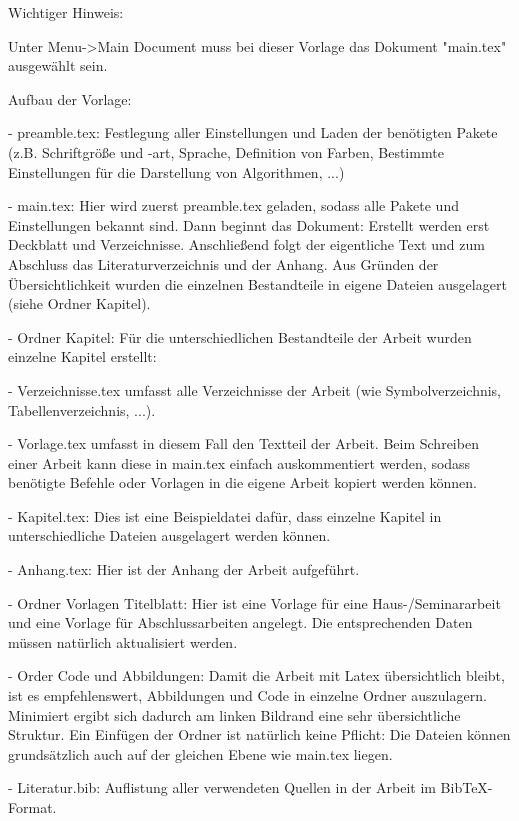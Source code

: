 Wichtiger Hinweis:

Unter Menu->Main Document muss bei dieser Vorlage das Dokument "main.tex" ausgewählt sein.

Aufbau der Vorlage:

- preamble.tex: Festlegung aller Einstellungen und Laden der benötigten Pakete (z.B. Schriftgröße und -art, Sprache, Definition von Farben, Bestimmte Einstellungen für die Darstellung von Algorithmen, ...)

- main.tex: Hier wird zuerst preamble.tex geladen, sodass alle Pakete und Einstellungen bekannt sind. Dann beginnt das Dokument: Erstellt werden erst Deckblatt und Verzeichnisse. Anschließend folgt der eigentliche Text und zum Abschluss das Literaturverzeichnis und der Anhang. Aus Gründen der Übersichtlichkeit wurden die einzelnen Bestandteile in eigene Dateien ausgelagert (siehe Ordner Kapitel).

- Ordner Kapitel: Für die unterschiedlichen Bestandteile der Arbeit wurden einzelne Kapitel erstellt:

    - Verzeichnisse.tex umfasst alle Verzeichnisse der Arbeit (wie Symbolverzeichnis, Tabellenverzeichnis, ...). 

    - Vorlage.tex umfasst in diesem Fall den Textteil der Arbeit. Beim Schreiben einer Arbeit kann diese in main.tex einfach auskommentiert werden, sodass benötigte Befehle oder Vorlagen in die eigene Arbeit kopiert werden können. 

    - Kapitel.tex: Dies ist eine Beispieldatei dafür, dass einzelne Kapitel in unterschiedliche Dateien ausgelagert werden können. 

    - Anhang.tex: Hier ist der Anhang der Arbeit aufgeführt.

- Ordner Vorlagen Titelblatt: Hier ist eine Vorlage für eine Haus-/Seminararbeit und eine Vorlage für Abschlussarbeiten angelegt. Die entsprechenden Daten müssen natürlich aktualisiert werden. 

- Order Code und Abbildungen: Damit die Arbeit mit Latex übersichtlich bleibt, ist es empfehlenswert, Abbildungen und Code in einzelne Ordner auszulagern. Minimiert ergibt sich dadurch am linken Bildrand eine sehr übersichtliche Struktur. Ein Einfügen der Ordner ist natürlich keine Pflicht: Die Dateien können grundsätzlich auch auf der gleichen Ebene wie main.tex liegen.

- Literatur.bib: Auflistung aller verwendeten Quellen in der Arbeit im BibTeX-Format.